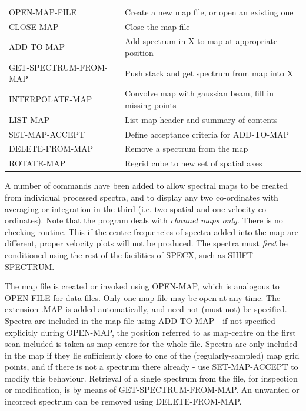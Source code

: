 \documentclass[11pt,twoside]{report}
\begin{document}
\begin{tabular}{ll}
OPEN-MAP-FILE           & Create a new map file, or open an existing one\\
CLOSE-MAP               & Close the map file\\
ADD-TO-MAP              & Add spectrum in X to map at appropriate position\\
GET-SPECTRUM-FROM-MAP   & Push stack and get spectrum from map into X\\
INTERPOLATE-MAP         & Convolve map with gaussian beam, fill in missing points\\
LIST-MAP                & List map header and summary of contents\\
SET-MAP-ACCEPT          & Define acceptance criteria for ADD-TO-MAP\\
DELETE-FROM-MAP         & Remove a spectrum from the map\\
ROTATE-MAP              & Regrid cube to new set of spatial axes\\
\end{tabular}

A number of commands have been added to allow spectral maps to be created
from individual processed spectra, and to display any two co-ordinates with
averaging or integration in the third (i.e. two spatial and one velocity
co-ordinates). Note that the program deals with {\em channel maps only}.
 There is no checking routine. This if the centre
frequencies of spectra added into the map are different, proper velocity plots
will not be produced. The spectra must {\em first} be conditioned using the
rest of the facilities of SPECX, such as SHIFT-SPECTRUM. 

The map file is created or invoked using OPEN-MAP, which is analogous to
OPEN-FILE for data files. Only one map file may be open at any time.
 The extension .MAP is added
automatically, and need not (must not) be specified. Spectra are included in the
map file using ADD-TO-MAP - if not specified explicitly during OPEN-MAP, the
position referred to as map-centre on the first scan included is taken as map
centre for the whole file. Spectra are only included in the map if they lie
sufficiently close to one of the (regularly-sampled) map grid points, and if
there is not a spectrum there already - use SET-MAP-ACCEPT to modify this
behaviour. Retrieval of a single spectrum from the file, for inspection or
modification, is by means of GET-SPECTRUM-FROM-MAP. An unwanted or incorrect
spectrum can be removed using DELETE-FROM-MAP.
\end{document}

